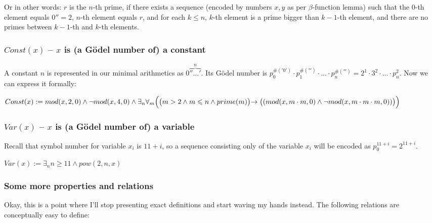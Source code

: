 \documentclass{article}
\begin{document}
Or in other words: $r$ is the $n$-th prime, if there exists a sequence (encoded by numbers
$x, y$ as per $\beta$-function lemma) such that the $0$-th element equals $0'' = 2$, $n$-th element
equals $r$, and for each $k \leqslant n$, $k$-th element is a prime bigger than $k-1$-th element,
and there are no primes between $k-1$-th and $k$-th elements.

\subsubsection{$Const(x)$ -- $x$ is (a Gödel number of) a constant}

A constant $n$ is represented in our minimal arithmetics as $0\overbrace{''...'}^{n}$.
Its Gödel number is $p_0^{\#('0')} \cdot p_1^{\#(''')} \cdot ... \cdot p_n^{\#(''')} =
2^1 \cdot 3^2 \cdot ... \cdot p_n^2$. Now we can express it formally:

\begin{center}
    $Const(x) := mod(x, 2, 0) \land \neg mod(x, 4, 0) \land
    \exists_n \forall_m \Bigl(
        \bigl(
            m > 2 \land m \leqslant n \land prime(m)
        \bigl)
        \rightarrow
        \bigl(
            (mod(x, m \cdot m, 0) \land \neg mod(x, m \cdot m \cdot m, 0))
        \bigl)
    \Bigl)$
\end{center}

\subsubsection{$Var(x)$ -- $x$ is (a Gödel number of) a variable}

Recall that symbol number for variable $x_i$ is $11 + i$, so a sequence consisting only of
the variable $x_i$ will be encoded as $p_0^{11 + i} = 2^{11 + i}$.

\begin{center}
    $Var(x) := \exists_n n \geqslant 11 \land pow(2, n, x)$
\end{center}

\subsubsection{Some more properties and relations}

Okay, this is a point where I'll stop presenting exact definitions and start waving my hands
instead. The following relations are conceptually easy to define:
\end{document}
